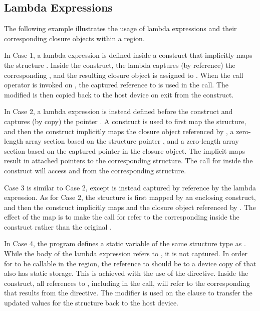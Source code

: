 \begin{cppspecific}[4ex]
\section{Lambda Expressions}
\label{sec:lambda_expressions}



The following example illustrates the usage of lambda expressions and their
corresponding closure objects within a  region.

In Case 1, a lambda expression is defined inside a  construct
that implicitly maps the structure . Inside the construct, the
lambda captures (by reference) the corresponding , and the resulting
closure object is assigned to .  When the call operator is
invoked on , the captured reference to  is used in
the call.  The modified  is then copied back to the host device on
exit from the  construct.

In Case 2, a lambda expression is instead defined before the 
construct and captures (by copy) the pointer . A
 construct is used to first map the structure, and
then the  construct implicitly maps the closure object
referenced by , a zero-length array section based on the
structure pointer , and a zero-length array section based on the
captured pointer in the closure object. The implicit maps result in attached
pointers to the corresponding structure. The call for  inside
the  construct will access  and 
from the corresponding structure.

Case 3 is similar to Case 2, except  is instead captured by
reference by the lambda expression. As for Case 2, the structure is first
mapped by an enclosing  construct, and then the
 construct implicitly maps  and the closure object
referenced by . The effect of the map is to make the
call for  refer to the corresponding  inside the
 construct rather than the original .

In Case 4, the program defines a static variable  of the same
structure type as . While the body of the lambda expression refers
to , it is not captured. In order for  to be
callable in the  region, the reference to  should be
to a device copy of  that also has static storage. This is achieved
with the use of the  directive.  Inside the
 construct, all references to , including in the
 call, will refer to the corresponding  that
results from the  directive. The 
modifier is used on the  clause to transfer the updated values for
the structure back to the host device.

\end{cppspecific}
